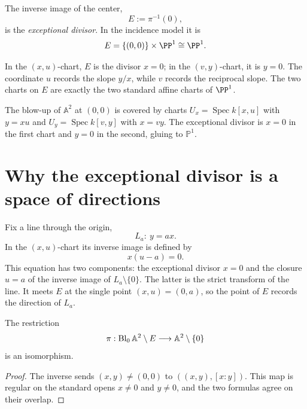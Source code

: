 \begin{definition}\label{def:vi45-exceptional-divisor}
The inverse image of the center,
\[
  E:=\pi^{-1}(0),
\]
is the \emph{exceptional divisor}.  In the incidence model it is
\[
  E=\{(0,0)\}\times\PP^1\cong\PP^1.
\]
\end{definition}

In the \((x,u)\)-chart, \(E\) is the divisor \(x=0\); in the \((v,y)\)-chart, it is \(y=0\).  The coordinate \(u\) records the slope \(y/x\), while \(v\) records the reciprocal slope.  The two charts on \(E\) are exactly the two standard affine charts of \(\PP^1\).



\begin{example}\label{ex:vi45-expand-01}
The blow-up of $\mathbb A^2$ at $(0,0)$ is covered by charts $U_x=\operatorname{Spec}k[x,u]$ with $y=xu$ and $U_y=\operatorname{Spec}k[v,y]$ with $x=vy$.  The exceptional divisor is $x=0$ in the first chart and $y=0$ in the second, gluing to $\mathbb P^1$.
\end{example}
\section{Why the exceptional divisor is a space of directions}

Fix a line through the origin,
\[
  L_a:\ y=ax.
\]
In the \((x,u)\)-chart its inverse image is defined by
\[
  x(u-a)=0.
\]
This equation has two components: the exceptional divisor \(x=0\) and the closure \(u=a\) of the inverse image of \(L_a\setminus\{0\}\).  The latter is the strict transform of the line.  It meets \(E\) at the single point \((x,u)=(0,a)\), so the point of \(E\) records the direction of \(L_a\).

\begin{proposition}\label{prop:vi45-isomorphism-off-center}
The restriction
\[
  \pi:\operatorname{Bl}_0\mathbb A^2\setminus E\longrightarrow\mathbb A^2\setminus\{0\}
\]
is an isomorphism.
\end{proposition}

\begin{proof}
The inverse sends \((x,y)\neq(0,0)\) to \(((x,y),[x:y])\).  This map is regular on the standard opens \(x\neq0\) and \(y\neq0\), and the two formulas agree on their overlap.
\end{proof}

